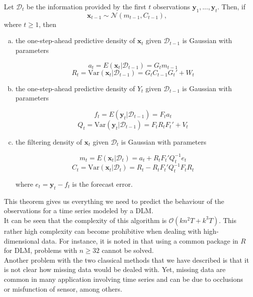 \documentclass{article}
\begin{document}
\begin{theorem}
Let $\mathcal{D}_t$ be the information provided by the first $t$ observations $\mathbf{y}_1, ..., \mathbf{y}_t$.
Then, if
$$\mathbf{x}_{t-1} \sim \mathcal{N}(m_{t-1}, C_{t-1}),$$
where $t \ge 1$, then

\begin{enumerate}[(a)]

\item the one-step-ahead predictive density of $\mathbf{x}_t$ given $\mathcal{D}_{t-1}$ is Gaussian with parameters

$$a_t = E(\mathbf{x}_t|\mathcal{D}_{t-1}) = G_tm_{t-1}$$
$$R_t = \text{Var}(\mathbf{x}_t|\mathcal{D}_{t-1}) = G_tC_{t-1}G_t' + W_t$$

\item the one-step-ahead predictive density of $Y_t$ given $\mathcal{D}_{t-1}$ is Gaussian with parameters

$$f_t = E(\mathbf{y}_t|\mathcal{D}_{t-1}) = F_ta_t$$
$$Q_t = \text{Var}(\mathbf{y}_t|\mathcal{D}_{t-1}) = F_tR_tF_t' + V_t$$

\item the filtering density of $\mathbf{x}_t$ given $\mathcal{D}_t$ is Gaussian with parameters

$$m_t = E(\mathbf{x}_t|\mathcal{D}_{t}) = a_t + R_tF_t'Q_t^{-1}e_t$$
$$C_t = \text{Var}(\mathbf{x}_t|\mathcal{D}_{t}) = R_t - R_tF_t'Q_t^{-1}F_tR_t$$

where $e_t = \mathbf{y}_t-f_t$ is the forecast error.

\end{enumerate}

\end{theorem}

This theorem gives us everything we need to predict the behaviour of the observations for a time series modeled by a DLM. \\

It can be seen that the complexity of this algorithm is $\mathcal{O}(kn^2T + k^3T)$.
This rather high complexity can become prohibitive when dealing with high-dimensional data. For instance, it is noted in \cite{TRMF} that using a common package in $R$ for DLM, problems with $n \ge 32$ cannot be solved. \\

Another problem with the two classical methods that we have described is that it is not clear how missing data would be dealed with. Yet, missing data are common in many application involving time series and can be due to occlusions or misfunction of sensor, among others. \\
\end{document}
